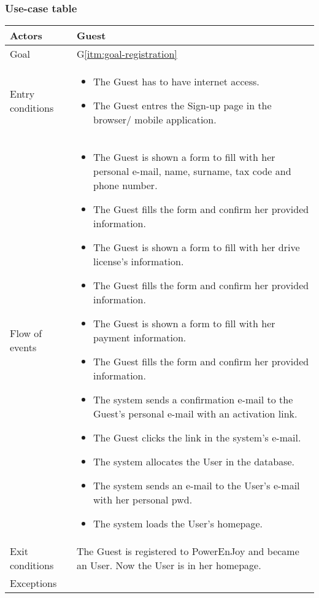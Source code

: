 \subsubsection{Use-case table}
\begin{center}
  \begin{tabular}{ l | p{12cm} }
    \hline
    Actors & Guest\\ \hline
    Goal & G\ref{itm:goal-registration}\\ \hline
    Entry conditions & 
\begin{itemize}
\item The Guest has to have internet access.
\item The Guest entres the Sign-up page in the browser/ mobile application. 
\end{itemize} \\ \hline
    Flow of events &
\begin{itemize} %
\item The Guest is shown a form to fill with her personal e-mail, name, surname, tax code and phone number. %
\item The Guest fills the form and confirm her provided information.
\item The Guest is shown a form to fill with her drive license's information.
\item The Guest fills the form and confirm her provided information.
\item The Guest is shown a form to fill with her payment information.
\item The Guest fills the form and confirm her provided information.
\item The system sends a confirmation e-mail to the Guest's personal e-mail with an activation link.
\item The Guest clicks the link in the system's e-mail.
\item The system allocates the User in the database.
\item The system sends an e-mail to the User's e-mail with her personal \gls{pwd}.
\item The system loads the User's homepage.
\end{itemize} \\ \hline
  	Exit conditions & The Guest is registered to PowerEnJoy and became an User. Now the User is in her homepage. \\ \hline
	Exceptions & 
\begin{itemize}

\end{itemize}
\end{tabular}
\end{center}
